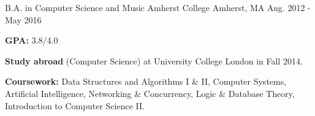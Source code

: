 

\begin{cventries}

  \cventry
    {B.A. in Computer Science and Music} %
    {Amherst College} %
    {Amherst, MA} %
    {Aug. 2012 - May 2016} %
    {
      \begin{cvitems} %
      	\item \textbf{GPA:} {3.8/4.0}
        \item \textbf{Study abroad} {(Computer Science) at University College London in Fall 2014.}
        \item \textbf{Coursework:} {Data Structures and Algorithms I \& II, Computer Systems, Artificial Intelligence, Networking \& Concurrency, Logic \& Database Theory, Introduction to Computer Science II.}
      \end{cvitems}
    }
\end{cventries}
